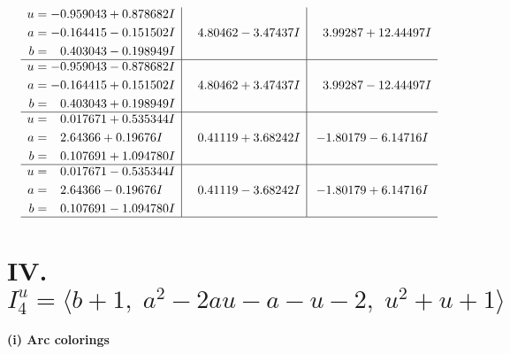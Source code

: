 \documentclass[1p]{elsarticle_modified}
\theoremstyle{definition}
\begin{document}
$$\begin{array}{c|c|c}
\begin{aligned}
u &= -0.959043 + 0.878682 I \\
a &= -0.164415 - 0.151502 I \\
b &= \phantom{-}0.403043 - 0.198949 I\end{aligned}
 & \phantom{-}4.80462 - 3.47437 I & \phantom{-}3.99287 + 12.44497 I \\ \hline\begin{aligned}
u &= -0.959043 - 0.878682 I \\
a &= -0.164415 + 0.151502 I \\
b &= \phantom{-}0.403043 + 0.198949 I\end{aligned}
 & \phantom{-}4.80462 + 3.47437 I & \phantom{-}3.99287 - 12.44497 I \\ \hline\begin{aligned}
u &= \phantom{-}0.017671 + 0.535344 I \\
a &= \phantom{-}2.64366 + 0.19676 I \\
b &= \phantom{-}0.107691 + 1.094780 I\end{aligned}
 & \phantom{-}0.41119 + 3.68242 I & -1.80179 - 6.14716 I \\ \hline\begin{aligned}
u &= \phantom{-}0.017671 - 0.535344 I \\
a &= \phantom{-}2.64366 - 0.19676 I \\
b &= \phantom{-}0.107691 - 1.094780 I\end{aligned}
 & \phantom{-}0.41119 - 3.68242 I & -1.80179 + 6.14716 I\\
 \hline 
 \end{array}$$\newpage\newpage\renewcommand{\arraystretch}{1}
\centering \section*{IV. $I^u_{4}= \langle b+1,\;a^2-2 a u- a- u-2,\;u^2+u+1 \rangle$}
\flushleft \textbf{(i) Arc colorings}\\
\end{document}
